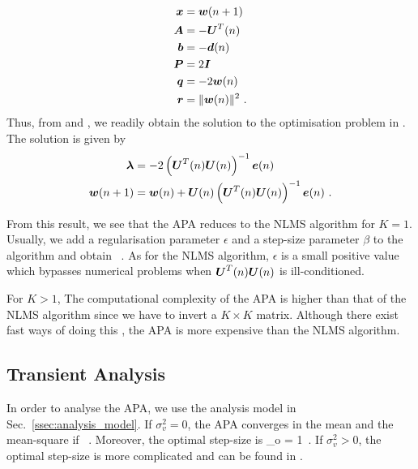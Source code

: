 \begin{align}
  \boldsymbol{x} &= \boldsymbol{w}(n+1)\\
  \boldsymbol{A} &= -\boldsymbol{U}^T(n)\\
  \boldsymbol{b} &= -\boldsymbol{d}(n)\\
  \boldsymbol{P} &= 2\boldsymbol{I}\\
  \boldsymbol{q} &= -2\boldsymbol{w}(n)\\
  \boldsymbol{r} &= \|\boldsymbol{w}(n)\|^2\ .
\end{align}
Thus, from  and , we readily obtain the solution to the optimisation problem in . The solution is given by
\begin{align}
  \vect{\lambda} &= -2\left(\vect{U}^T(n)\vect{U}(n)\right)^{-1}\vect{e}(n)\\
  \vect{w}(n+1) &= \vect{w}(n)+\vect{U}(n)\left(\vect{U}^T(n)\vect{U}(n)\right)^{-1}\vect{e}(n)\ .
\end{align}

From this result, we see that the APA reduces to the NLMS algorithm for $K=1$. Usually, we add a regularisation parameter $\epsilon$ and a step-size parameter $\beta$ to the algorithm and obtain
\bmath
  \ .
\emath
As for the NLMS algorithm, $\epsilon$ is a small positive value which bypasses numerical problems when $\boldsymbol{U}^T(n)\boldsymbol{U}(n)$ is ill-conditioned.

For $K>1$, The computational complexity of the APA is higher than that of the NLMS algorithm since we have to invert a $K\times K$ matrix. Although there exist fast ways of doing this \cite[pp.~339--340]{Haykin2001}, the APA is more expensive than the NLMS algorithm.

\subsection{Transient Analysis}
In order to analyse the APA, we use the analysis model in Sec.~\ref{ssec:analysis_model}. If $\sigma_v^2=0$, the APA converges in the mean and the mean-square if \cite[p.~337]{Haykin2001}
\bmath
  \ .
\emath
Moreover, the optimal step-size is
\bmath
  \beta_o = 1\ .
\emath
If $\sigma_v^2>0$, the optimal step-size is more complicated and can be found in \cite[p.~337]{Haykin2001}.

